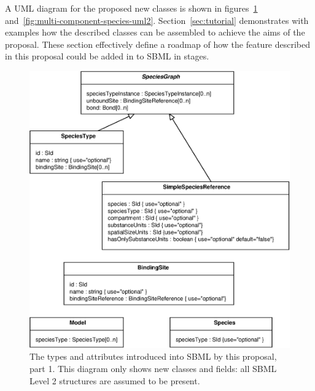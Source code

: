 \documentclass{cekarticle}
\begin{document}
A UML diagram for the proposed new classes is shown in
figures~\ref{fig:multi-component-species-uml} and~\ref{fig:multi-component-species-uml2}.
Section~\ref{sec:tutorial}
demonstrates with examples how the described classes can be assembled to
achieve the aims of the proposal.  These section effectively define a roadmap
of how the feature described in this proposal could be added in to SBML in stages.

\begin{figure}[h]
  \vspace*{8pt}
  \centering
  \includegraphics[scale = 0.7]{multi-component-species-uml.eps}
  \caption{The types and attributes introduced into SBML by this proposal, part 1.  This diagram
  only shows new classes and fields: all SBML Level 2 structures are assumed to be present.}
  \label{fig:multi-component-species-uml}
\end{figure}
\end{document}
